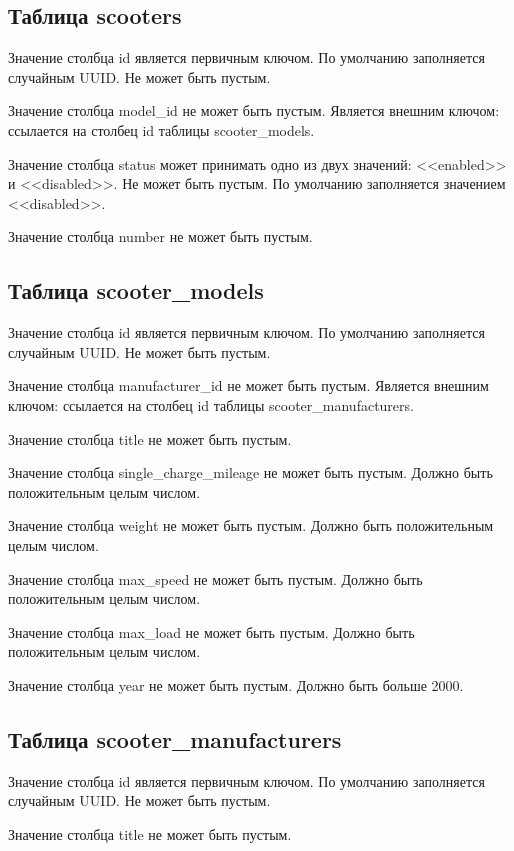 \subsection{Таблица scooters}

Значение столбца id является первичным ключом. По умолчанию заполняется случайным UUID. Не может быть пустым.

Значение столбца model\_id не может быть пустым. Является внешним ключом: ссылается на столбец id таблицы scooter\_models.

Значение столбца status может принимать одно из двух значений: <<enabled>> и <<disabled>>. Не может быть пустым. По умолчанию заполняется значением <<disabled>>.

Значение столбца number не может быть пустым.

\subsection{Таблица scooter\_models}

Значение столбца id является первичным ключом. По умолчанию заполняется случайным UUID. Не может быть пустым.

Значение столбца manufacturer\_id не может быть пустым. Является внешним ключом: ссылается на столбец id таблицы scooter\_manufacturers.

Значение столбца title не может быть пустым.

Значение столбца single\_charge\_mileage не может быть пустым. Должно быть положительным целым числом.

Значение столбца weight не может быть пустым. Должно быть положительным целым числом.

Значение столбца max\_speed не может быть пустым. Должно быть положительным целым числом.

Значение столбца max\_load не может быть пустым. Должно быть положительным целым числом.

Значение столбца year не может быть пустым. Должно быть больше 2000.

\subsection{Таблица scooter\_manufacturers}

Значение столбца id является первичным ключом. По умолчанию заполняется случайным UUID. Не может быть пустым.

Значение столбца title не может быть пустым.

